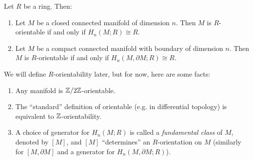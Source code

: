 \begin{theorem}
  Let $R$ be a ring. Then:
  \begin{enumerate}
    \item Let $M$ be a closed connected
      manifold of dimension $n$. Then
      $M$ is $R$-orientable if and only if
      $H_n(M; R) \cong R$.
    \item Let $M$ be a compact connected
      manifold with boundary of dimension $n$.
      Then $M$ is $R$-orientable if and only
      if $H_n(M, \partial M; R) \cong R$.
  \end{enumerate}
\end{theorem}

\begin{remark}
  We will define $R$-orientability later,
  but for now, here are some facts:
  \begin{enumerate}
    \item Any manifold is $\mathbb{Z} / 2\mathbb{Z}$-orientable.
    \item The ``standard'' definition of
      orientable (e.g. in differential
      topology) is equivalent to
      $\mathbb{Z}$-orientability.
    \item A choice of generator for $H_n(M; R)$
      is called a \emph{fundamental class}
      of $M$, denoted by $[M]$, and $[M]$
      ``determines'' an $R$-orientation on
      $M$ (similarly for $[M, \partial M]$
      and
      a generator for $H_n(M, \partial M; R)$).
  \end{enumerate}
\end{remark}


